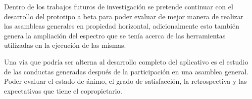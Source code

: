 Dentro de los trabajos futuros de investigación se pretende continuar con el desarrollo del prototipo a beta para poder evaluar de mejor manera de realizar las asambleas generales en propiedad horizontal, adicionalmente esto también genera la ampliación del espectro que se tenía acerca de las herramientas utilizadas en la ejecución de las mismas. 

\vspace{0.5cm}

Una vía que podría ser alterna al desarrollo completo del aplicativo es el estudio de las conductas generadas después de la participación en una asamblea general. Poder evaluar el estado de ánimo, el grado de satisfacción, la retrospectiva y las expectativas que tiene el copropietario.



\newpage